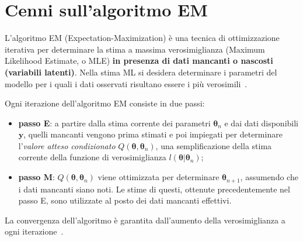 \section[Cenni sull'algoritmo EM]{Cenni sull'algoritmo EM}
L'algoritmo EM (Expectation-Maximization) è una tecnica di ottimizzazione iterativa per determinare la stima a massima verosimiglianza (Maximum Likelihood Estimate, o MLE) \textbf{in presenza di dati mancanti o nascosti (variabili latenti)}. Nella stima ML si desidera determinare i parametri del modello per i quali i dati osservati risultano essere i più verosimili~\cite{paper_EM_algorithm}. \par Ogni iterazione dell'algoritmo EM consiste in due passi:
\begin{itemize}
	\item \textbf{passo E}: a partire dalla stima corrente dei parametri $\boldsymbol{\theta}_n$ e dai dati disponibili $\mathbf{y}$, quelli mancanti vengono prima stimati e poi impiegati per determinare l'\textit{valore atteso condizionato} $Q(\boldsymbol{\theta},\boldsymbol{\theta}_n)$, una semplificazione della stima corrente della funzione di verosimiglianza $l(\boldsymbol{\theta}|\boldsymbol{\theta}_n)$;
	\item \textbf{passo M}: $Q(\boldsymbol{\theta},\boldsymbol{\theta}_n)$ viene ottimizzata per determinare $\boldsymbol{\theta}_{n+1}$, assumendo che i dati mancanti siano noti. Le stime di questi, ottenute precedentemente nel passo E, sono utilizzate al posto dei dati mancanti effettivi.
\end{itemize}
La convergenza dell'algoritmo è garantita dall'aumento della verosimiglianza a ogni iterazione~\cite{paper_EM_algorithm}.

